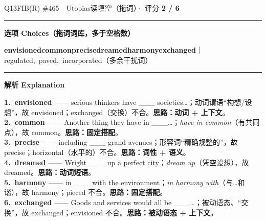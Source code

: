 \documentclass[11pt]{article}
\newcommand{\ptesub}[1]{%
  \par\needspace{2\baselineskip}\smallskip
  {\color{cAccent}\rule[-0.2ex]{3pt}{1.05em}}\hspace{6pt}%
  {\bfseries\color{cHead}#1}\par\nopagebreak\smallskip}
\begin{document}
\begin{qblock}{Q13\quad FIB(R) \#465\ \ Utopias}{读填空（拖词）· 评分 \textcolor{cAccent}{\bfseries 2 / 6}}
\ptesub{选项 Choices（拖词词库，多于空格数）}
{\small \textbf{envisioned}\quad \textbf{common}\quad \textbf{precise}\quad \textbf{dreamed}\quad \textbf{harmony}\quad \textbf{exchanged}\quad ｜\quad regulated,\ paved,\ incorporated（多余干扰词）}
\ptesub{解析 Explanation}
\begin{notebox}\footnotesize
\textbf{1.\ envisioned} —— serious thinkers have \_\_\_ societies…；动词谓语“构想/设想”，故 envisioned；exchanged（交换）不合。\textbf{思路：动词 + 上下文}。\\[2pt]
\textbf{2.\ common} —— Another thing they have in \_\_\_…；\emph{have in common}（有共同点），故 common。\textbf{思路：固定搭配}。\\[2pt]
\textbf{3.\ precise} —— including \_\_\_ grand avenues；形容词“精确规整的”，故 precise；horizontal（水平的）不合。\textbf{思路：词性 + 语义}。\\[2pt]
\textbf{4.\ dreamed} —— Wright \_\_\_ up a perfect city；\emph{dream up}（凭空设想），故 dreamed。\textbf{思路：动词短语}。\\[2pt]
\textbf{5.\ harmony} —— in \_\_\_ with the environment；\emph{in harmony with}（与…和谐），故 harmony；pieced 不合。\textbf{思路：固定搭配}。\\[2pt]
\textbf{6.\ exchanged} —— Goods and services would all be \_\_\_…；被动语态、“交换”，故 exchanged；envisioned 不合。\textbf{思路：被动语态 + 上下文}。
\end{notebox}
\end{qblock}
\end{document}
